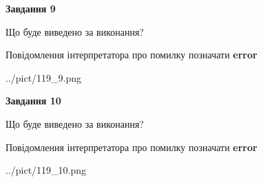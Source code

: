 \documentclass[12pt, ukrainian]{article}
\begin{document}
{{\begin {center}\textbf{Завдання 9}\end {center}}\par
Що буде виведено за виконання? \par
Повідомлення інтерпретатора про помилку позначати \textbf{error}

\begin{center}
	{../pict/119_9.png}
\end{center}
\newpage

{\begin {center}\textbf{Завдання 10}\end {center}}\par
Що буде виведено за виконання? \par
Повідомлення інтерпретатора про помилку позначати \textbf{error}

\begin{center}
	{../pict/119_10.png}
\end{center}
\newpage

}
\end{document}
